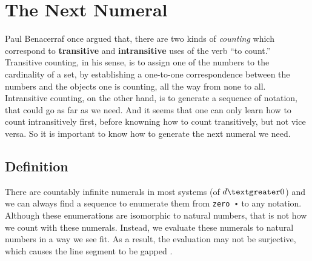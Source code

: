 \documentclass[\main/thesis.tex]{subfiles}
\begin{document}
\section{The Next Numeral}\label{next}

Paul Benacerraf once argued\cite{benacerraf1965numbers} that, there are two kinds
of \textit{counting} which correspond to \textbf{transitive} and \textbf{intransitive}
uses of the verb ``to count.'' Transitive counting, in his sense, is to assign one
of the numbers to the cardinality of a set, by establishing a one-to-one correspondence
between the numbers and the objects one is counting, all the way from none to
all. Intransitive counting, on the other hand, is to generate a sequence of
notation, that could go as far as we need. And it seems that one can only learn
how to count intransitively first, before knowning how to count transitively,
but not vice versa. So it is important to know how to generate the next numeral
we need.

\subsection{Definition}

There are countably infinite numerals in most systems (of $ d \textgreater 0 $)
and we can always find a sequence to enumerate them from {\lstinline|zero ∙|} to
any notation.
Although these enumerations are isomorphic to natural numbers, that is not how we
count with these numerals. Instead, we evaluate these numerals to natural numbers
in a way we see fit. As a result, the evaluation may not be surjective, which
causes the line segment to be gapped      .
\end{document}
